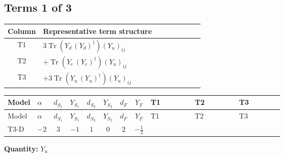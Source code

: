\documentclass[8pt]{article}
\begin{document}
\begin{landscape}
\subsection*{Terms 1 of 3}
\begin{center}
\begin{tabular}{@{}c >{\raggedright\arraybackslash}p{0.82\linewidth}@{}}
\toprule
Column & Representative term structure \\
\midrule
T1 & \(\displaystyle 3 \operatorname{Tr}\!\left({Y_d}\,\left({Y_d}\right)^{\dagger}\right) \left({Y_u}\right)_{ij}\) \\
\midrule
T2 & \(\displaystyle +\operatorname{Tr}\!\left({Y_e}\,\left({Y_e}\right)^{\dagger}\right) \left({Y_u}\right)_{ij}\) \\
\midrule
T3 & \(\displaystyle +3 \operatorname{Tr}\!\left({Y_u}\,\left({Y_u}\right)^{\dagger}\right) \left({Y_u}\right)_{ij}\) \\
\midrule
\bottomrule
\end{tabular}
\end{center}
\smallskip
\tiny
\begin{longtable}{@{}llcccccc >{\raggedright\arraybackslash}p{0.21\linewidth} >{\raggedright\arraybackslash}p{0.21\linewidth} >{\raggedright\arraybackslash}p{0.21\linewidth}@{}}
\toprule
Model & $\alpha$ & $d_{S_1}$ & $Y_{S_1}$ & $d_{S_2}$ & $Y_{S_2}$ & $d_F$ & $Y_F$ & T1 & T2 & T3 \\
\midrule
\endfirsthead
\toprule
Model & $\alpha$ & $d_{S_1}$ & $Y_{S_1}$ & $d_{S_2}$ & $Y_{S_2}$ & $d_F$ & $Y_F$ & T1 & T2 & T3 \\
\midrule
\endhead
T3-D & $-2$ & $3$ & $-1$ & $1$ & $0$ & $2$ & $-\frac{1}{2}$ & \scriptsize\adjustbox{max width=\linewidth}{$\begin{gathered} 3 \operatorname{Tr}\!\left({Y_d}\,\left({Y_d}\right)^{\dagger}\right) \left({Y_u}\right)_{ij}\end{gathered}$} & \scriptsize\adjustbox{max width=\linewidth}{$\begin{gathered} +\operatorname{Tr}\!\left({Y_e}\,\left({Y_e}\right)^{\dagger}\right) \left({Y_u}\right)_{ij}\end{gathered}$} & \scriptsize\adjustbox{max width=\linewidth}{$\begin{gathered} +3 \operatorname{Tr}\!\left({Y_u}\,\left({Y_u}\right)^{\dagger}\right) \left({Y_u}\right)_{ij}\end{gathered}$} \\
\midrule
\bottomrule
\end{longtable}
\clearpage
\noindent\textbf{Quantity: }$Y_u$\par\smallskip

\end{landscape}
\end{document}
